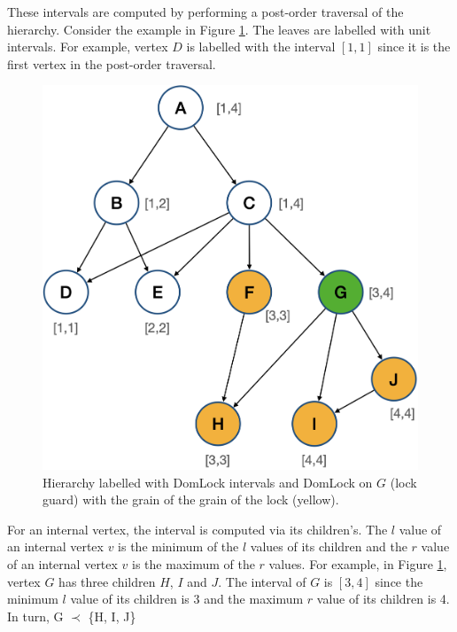 
These intervals are computed by performing a post-order traversal of the hierarchy. Consider the example in Figure \ref{fig:domlock_example_locked}. The leaves are labelled with unit intervals. For example, vertex $D$ is labelled with the interval $[1, 1]$ since it is the first vertex in the post-order traversal. 

\begin{figure}
    \centering
    \captionsetup{justification=centering}
    \includegraphics[width=.6\textwidth]{figures/domlock_example_with_lock.png}
    \caption{Hierarchy labelled with DomLock intervals and DomLock on $G$ (lock guard) with the grain of the grain of the lock (yellow).}
    \label{fig:domlock_example_locked}
\end{figure}
For an internal vertex, the interval is computed via its children's. The $l$ value of an internal vertex $v$ is the minimum of the $l$ values of its children and the $r$ value of an internal vertex $v$ is the maximum of the $r$ values. For example, in Figure \ref{fig:domlock_example_locked}, vertex $G$ has three children $H$, $I$ and $J$. The interval of $G$ is $[3,4]$ since the minimum $l$ value of its children is 3 and the maximum $r$ value of its children is 4.  In turn, G $\prec$ \{H, I, J\}


